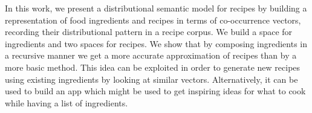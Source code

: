 In this work, we present a distributional semantic model for recipes by building a representation of food ingredients and recipes in terms of co-occurrence vectors, recording their distributional pattern in a recipe corpus. We build a space for ingredients and two spaces for recipes. We show that by composing ingredients in a recursive manner we get a more accurate approximation of recipes than by a more basic method. This idea can be exploited in order to generate new recipes using existing ingredients by looking at similar vectors. Alternatively, it can be used to build an app which might be used to get inspiring ideas for what to cook while having a list of ingredients.
